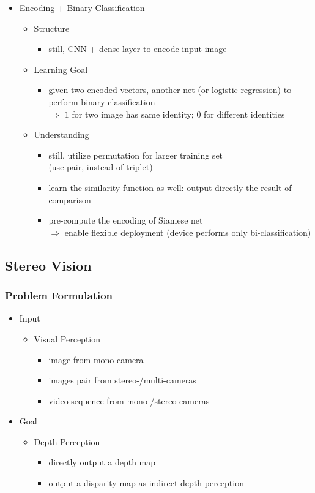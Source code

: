 \begin{itemize}
\item Encoding + Binary Classification
	\begin{itemize}
	\item Structure
		\begin{itemize}
		\item still, CNN + dense layer to encode input image
		\end{itemize}
	\item Learning Goal
		\begin{itemize}
		\item given two encoded vectors, another net (or logistic regression) to perform binary classification \\
		$\Rightarrow$ $1$ for two image has same identity; $0$ for different identities
		\end{itemize}
	\item Understanding
		\begin{itemize}
		\item still, utilize permutation for larger training set \\ 
		(use pair, instead of triplet)
		\item learn the similarity function as well: output directly the result of comparison
		\item pre-compute the encoding of Siamese net \\
		$\Rightarrow$ enable flexible deployment (device performs only bi-classification)
		\end{itemize}
	\end{itemize}
\end{itemize}

\subsection{Stereo Vision}
\subsubsection{Problem Formulation}
\begin{itemize}
\item Input
	\begin{itemize}
	\item Visual Perception
		\begin{itemize}
		\item image from mono-camera
		\item images pair from stereo-/multi-cameras
		\item video sequence from mono-/stereo-cameras
		\end{itemize}
	\end{itemize}
\item Goal
	\begin{itemize}
	\item Depth Perception
		\begin{itemize}
		\item directly output a depth map
		\item output a disparity map as indirect depth perception
		\end{itemize}
	\end{itemize}
\end{itemize}
